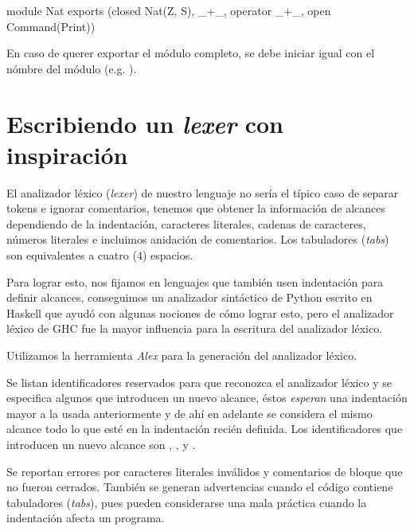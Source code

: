 {\begin{designfr}
\begin{anglercode}
module Nat exports (closed Nat(Z, S), _+_, operator _+_, open Command(Print))
\end{anglercode}

En caso de querer exportar el módulo completo, se debe iniciar igual con el nómbre del módulo (e.g. ).
\end{designfr}

\section{Escribiendo un \emph{lexer} con inspiración}

\begin{designfr}
El analizador léxico (\emph{lexer}) de nuestro lenguaje no sería el típico caso de separar tokens e ignorar comentarios, tenemos que obtener la información de alcances dependiendo de la indentación, caracteres literales, cadenas de caracteres, números literales e incluimos anidación de comentarios. Los tabuladores (\emph{tabs}) son equivalentes a cuatro (4) espacios.
\end{designfr}

\begin{investigationfr}
Para lograr esto, nos fijamos en lenguajes que también usen indentación para definir alcances, conseguimos un analizador sintáctico de Python escrito en Haskell \cite{python-parser} que ayudó con algunas nociones de cómo lograr esto, pero el analizador léxico de GHC \cite{ghc} fue la mayor influencia para la escritura del analizador léxico.
\end{investigationfr}

\begin{implementationfr}
Utilizamos la herramienta \emph{Alex} \cite{alex} para la generación del analizador léxico.

Se listan identificadores reservados para que reconozca el analizador léxico y se especifica algunos que introducen un nuevo alcance, éstos \emph{esperan} una indentación mayor a la usada anteriormente y de ahí en adelante se considera el mismo alcance todo lo que esté en la indentación recién definida. Los identificadores que introducen un nuevo alcance son , ,  y .

Se reportan errores por caracteres literales inválidos y comentarios de bloque que no fueron cerrados. También se generan advertencias cuando el código contiene tabuladores (\emph{tabs}), pues pueden considerarse una mala práctica cuando la indentación afecta un programa.


\end{implementationfr}}
